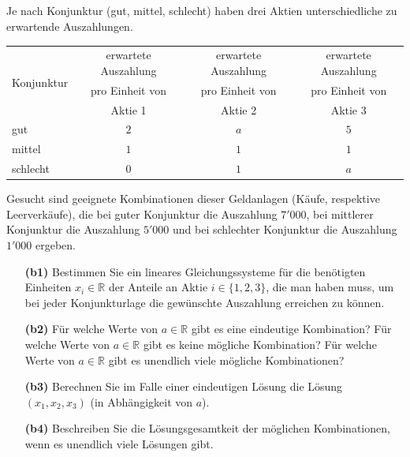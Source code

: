 \subsection*{}
Je nach Konjunktur (gut, mittel, schlecht) haben drei Aktien unterschiedliche zu erwartende Auszahlungen.
\begin{table}[H]
	\centering
	\begin{tabular}{|l |c |c |c|}
		\hline
		\multirow{3}{*}{Konjunktur}
		& erwartete Auszahlung	& erwartete Auszahlung & erwartete Auszahlung\\
		& pro Einheit von & pro Einheit von & pro Einheit von\\
		& Aktie 1 & Aktie 2	& Aktie 3\\
		\hline
		gut & $ 2 $  &  $ a $ &  $ 5 $ \\ 
		\hline
		mittel & $ 1 $ & $ 1 $ & $ 1 $  \\ 
		\hline
		schlecht & $ 0 $ & $ 1 $ & $ a $ \\
		\hline
	\end{tabular}%
\end{table}
Gesucht sind geeignete Kombinationen dieser Geldanlagen (Käufe, respektive Leerverkäufe), die bei guter Konjunktur die Auszahlung $ 7'000 $, bei mittlerer Konjunktur die Auszahlung $ 5'000 $ und bei schlechter Konjunktur die Auszahlung $ 1'000 $ ergeben.
\begin{enumerate}
	\item[\textbf{(b1)}]
	Bestimmen Sie ein lineares Gleichungssysteme für die benötigten Einheiten $ x_i \in \mathbb{R} $ der Anteile an Aktie $ i \in \{1,2,3\} $, die man haben muss, um bei jeder Konjunkturlage die gewünschte Auszahlung erreichen zu können.
	\item[\textbf{(b2)}] 
	Für welche Werte von $ a \in \mathbb{R} $ gibt es eine eindeutige Kombination?
	Für welche Werte von $ a \in \mathbb{R} $ gibt es keine mögliche Kombination?
	Für welche Werte von $ a \in \mathbb{R} $ gibt es unendlich viele mögliche Kombinationen?
	\item[\textbf{(b3)}]
	Berechnen Sie im Falle einer eindeutigen Lösung die Lösung $ (x_1,x_2,x_3) $ (in Abhängigkeit von $ a $).
	\item[\textbf{(b4)}]
	Beschreiben Sie die Lösungsgesamtkeit der möglichen Kombinationen, wenn es unendlich viele Lösungen gibt.
\end{enumerate}

\ \\
